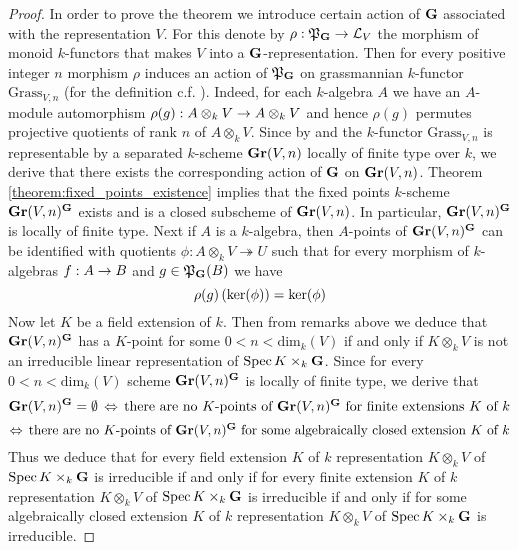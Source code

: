 \begin{proof}
In order to prove the theorem we introduce certain action of $\mathbf{G}$ associated with the representation $V$. For this denote by $\rho:{\mathfrak P}_{\mathbf{G}}\rightarrow {\mathcal L}_V$ the morphism of monoid $k$-functors that makes $V$ into a $\mathbf{G}$-representation. Then for every positive integer $n$ morphism $\rho$ induces an action of ${\mathfrak P}_{\mathbf{G}}$ on grassmannian $k$-functor $\mathrm{Grass}_{V,n}$ (for the definition c.f. {\cite[Section 6]{kfunctors}}). Indeed, for each $k$-algebra $A$ we have an $A$-module automorphism $\rho(g):A\otimes_kV \rightarrow A\otimes_kV$ and hence $\rho(g)$ permutes projective quotients of rank $n$ of $A\otimes_kV$. Since by {\cite[Theorem 6.3]{kfunctors}} and {\cite[Theorem 6.5]{kfunctors}} the $k$-functor $\mathrm{Grass}_{V,n}$ is representable by a separated $k$-scheme $\mathbf{Gr}(V,n)$ locally of finite type over $k$, we derive that there exists the corresponding action of $\mathbf{G}$ on $\mathbf{Gr}(V,n)$. Theorem \ref{theorem:fixed_points_existence} implies that the fixed points $k$-scheme $\mathbf{Gr}(V,n)^{\mathbf{G}}$ exists and is a closed subscheme of $\mathbf{Gr}(V,n)$. In particular, $\mathbf{Gr}(V,n)^{\mathbf{G}}$ is locally of finite type. Next if $A$ is a $k$-algebra, then $A$-points of $\mathbf{Gr}(V,n)^{\mathbf{G}}$ can be identified with quotients $\phi:A\otimes_kV\twoheadrightarrow U$ such that for every morphism of $k$-algebras $f:A\rightarrow B$ and $g\in {\mathfrak P}_{\mathbf{G}}(B)$ we have
$$\rho(g)\left(\mathrm{ker}(\phi)\right) = \mathrm{ker}(\phi)$$
Now let $K$ be a field extension of $k$. Then from remarks above we deduce that $\mathbf{Gr}(V,n)^{\mathbf{G}}$ has a $K$-point for some $0 < n <\mathrm{dim}_k(V)$ if and only if $K\otimes_kV$ is not an irreducible linear representation of $\mathrm{Spec}\, K\times_k\mathbf{G}$. Since for every $0 < n < \mathrm{dim}_k(V)$ scheme $\mathbf{Gr}(V,n)^{\mathbf{G}}$ is locally of finite type, we derive that
$$\mathbf{Gr}(V,n)^{\mathbf{G}}= \emptyset\,\Leftrightarrow\,\mbox{there are no $K$-points of $\mathbf{Gr}(V,n)^{\mathbf{G}}$ for finite extensions $K$ of $k$}$$
$$\Leftrightarrow\,\mbox{there are no $K$-points of $\mathbf{Gr}(V,n)^{\mathbf{G}}$ for some algebraically closed extension $K$ of $k$}$$
Thus we deduce that for every field extension $K$ of $k$ representation $K\otimes_kV$ of $\mathrm{Spec}\, K\times_k\mathbf{G}$ is irreducible if and only if for every finite extension $K$ of $k$ representation $K\otimes_kV$ of $\mathrm{Spec}\, K\times_k\mathbf{G}$ is irreducible if and only if for some algebraically closed  extension $K$ of $k$ representation $K\otimes_kV$ of $\mathrm{Spec}\, K\times_k\mathbf{G}$ is irreducible.
\end{proof}

